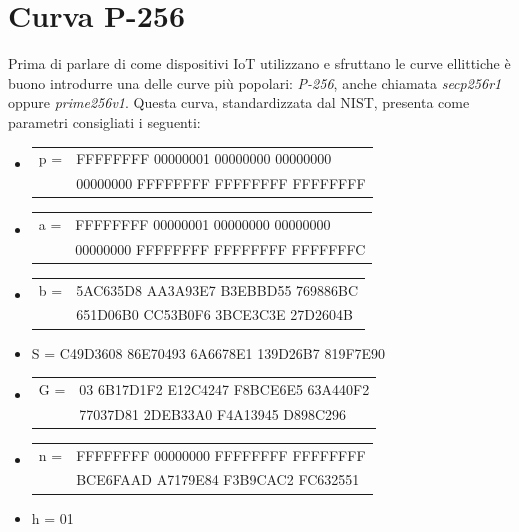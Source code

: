 \documentclass[12pt, a4paper]{report}
\begin{document}
\section{Curva P-256}

Prima di parlare di come dispositivi IoT utilizzano e sfruttano le curve ellittiche è buono introdurre una delle curve più popolari: 
\textit{P-256}, anche chiamata \textit{secp256r1} oppure \textit{prime256v1}.
Questa curva, standardizzata dal NIST, presenta come parametri consigliati i seguenti:
\begin{itemize}
    \item 
    \begin{tabular}[t]{@{}l l@{}}
        \small p = & FFFFFFFF 00000001 00000000 00000000 \\
            & 00000000 FFFFFFFF FFFFFFFF FFFFFFFF
    \end{tabular}

    \item 
    \begin{tabular}[t]{@{}l l@{}}
        \small a = &FFFFFFFF 00000001 00000000 00000000 \\
            & 00000000 FFFFFFFF FFFFFFFF FFFFFFFC
    \end{tabular}

    \item 
    \begin{tabular}[t]{@{}l l@{}}
        \small b = & 5AC635D8 AA3A93E7 B3EBBD55 769886BC \\
        & 651D06B0 CC53B0F6 3BCE3C3E 27D2604B
    \end{tabular}

    \small \item S = C49D3608 86E70493 6A6678E1 139D26B7 819F7E90
    \item 
    \begin{tabular}[t]{@{}l l@{}}
        \small G = & 03 6B17D1F2 E12C4247 F8BCE6E5 63A440F2 \\
            & 77037D81 2DEB33A0 F4A13945 D898C296
    \end{tabular}

    \item 
    \begin{tabular}[t]{@{}l l@{}}
        \small n = & FFFFFFFF 00000000 FFFFFFFF FFFFFFFF\\
            & BCE6FAAD A7179E84 F3B9CAC2 FC632551
    \end{tabular}

    \item h = 01

\end{itemize}
\end{document}
